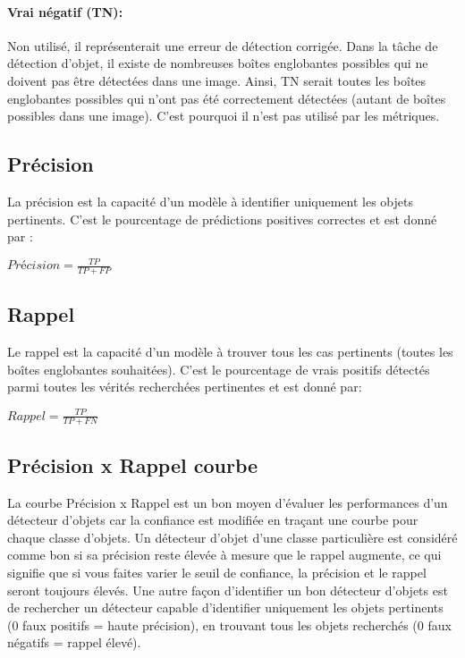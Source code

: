           \paragraph{Vrai négatif (TN):} Non utilisé, il représenterait une erreur de détection corrigée. Dans la tâche de détection d'objet, il existe de nombreuses boîtes englobantes possibles qui ne doivent pas être détectées dans une image. Ainsi, TN serait toutes les boîtes englobantes possibles qui n'ont pas été correctement détectées (autant de boîtes possibles dans une image). C'est pourquoi il n'est pas utilisé par les métriques.
          
          \subsection{Précision}
          La précision est la capacité d'un modèle à identifier uniquement les objets pertinents. C'est le pourcentage de prédictions positives correctes et est donné par :
          \begin{center} $Précision = \frac{TP}{TP + FP}$ \end{center}

          \subsection{Rappel}
          Le rappel est la capacité d'un modèle à trouver tous les cas pertinents (toutes les boîtes englobantes souhaitées). C'est le pourcentage de vrais positifs détectés parmi toutes les vérités recherchées pertinentes et est donné par:
          \begin{center} $Rappel = \frac{TP}{TP + FN}$ \end{center}
          
          \subsection{Précision x Rappel courbe}
          La courbe Précision x Rappel est un bon moyen d'évaluer les performances d'un détecteur d'objets car la confiance est modifiée en traçant une courbe pour chaque classe d'objets. Un détecteur d'objet d'une classe particulière est considéré comme bon si sa précision reste élevée à mesure que le rappel augmente, ce qui signifie que si vous faites varier le seuil de confiance, la précision et le rappel seront toujours élevés. Une autre façon d'identifier un bon détecteur d'objets est de rechercher un détecteur capable d'identifier uniquement les objets pertinents (0 faux positifs = haute précision), en trouvant tous les objets recherchés (0 faux négatifs = rappel élevé).
          
